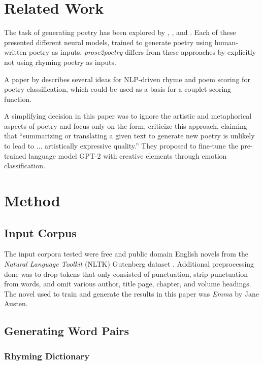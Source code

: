 \documentclass[11pt,a4paper]{article}
\begin{document}
\section{Related Work}
\label{sec:related}

The task of generating poetry has been explored by \citet{cole}, \citet{hopkins-kiela-2017}, and \citet{Xie2017DeepP}. Each of these presented different neural models, trained to generate poetry using human-written poetry as inputs. \textit{prose2poetry} differs from these approaches by explicitly not using rhyming poetry as inputs.

A paper by \citet{keswarani} describes several ideas for NLP-driven rhyme and poem scoring for poetry classification, which could be used as a basis for a couplet scoring function.

A simplifying decision in this paper was to ignore the artistic and metaphorical aspects of poetry and focus only on the form. \citet{bena2020introducing} criticize this approach, claiming that ``summarizing or translating a given text to generate new poetry is unlikely to lead to ... artistically expressive quality.'' They proposed to fine-tune the pre-trained language model GPT-2 \cite{gpt2} with creative elements through emotion classification.

\section{Method}
\label{sec:method}

\subsection{Input Corpus}

The input corpora tested were free and public domain English novels from the \textit{Natural Language Toolkit} (NLTK) Gutenberg dataset \cite[Chapter~2]{gutenbergnltk}. Additional preprocessing done was to drop tokens that only consisted of punctuation, strip punctuation from words, and omit various author, title page, chapter, and volume headings. The novel used to train and generate the results in this paper was \textit{Emma} by Jane Austen.

\subsection{Generating Word Pairs}

\subsubsection{Rhyming Dictionary}
\end{document}

